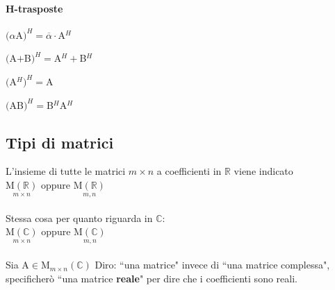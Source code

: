 \paragraph{H-trasposte}
\begin{enumerate}
        {\color{red}
    \item $(\alpha $A$)^H=\overline{\alpha}\cdot $A$^H$
        }
    \item $($A$+$B$)^H=$A$^H+$B$^H$
    \item $($A$^H)^H=$A
        {\color{red}
    \item $($AB$)^H=$B$^H$A$^H$
        }
\end{enumerate}
\subsection{Tipi di matrici}
L'insieme di tutte le matrici $m\times n$ a coefficienti in $\mathbb{R}$ viene indicato\\

$\underset{m\times n}{\textrm{M}(\mathbb{R})}$
oppure
$\underset{m,n}{\textrm{M}(\mathbb{R})}$\\\\
Stessa cosa per quanto riguarda in $\mathbb{C}$:\\

$\underset{m\times n}{\textrm{M}(\mathbb{C})}$
oppure
$\underset{m,n}{\textrm{M}(\mathbb{C})}$\\
\\
Sia A$\in$M$_{m\times n}(\mathbb{C})$
Diro: ``una matrice" invece di ``una matrice complessa", specificherò 
``una matrice \textbf{reale}" per dire che i coefficienti sono reali. 


